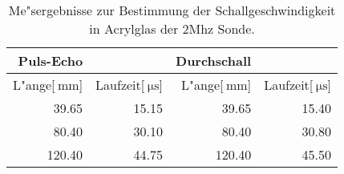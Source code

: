 
\begin{table}[!h]
\begin{center}
\begin{tabular}{|r|r|r|r|}
\hline
Puls-Echo & & Durchschall &\\
\hline
 L"ange[$\SI{}{\milli\meter}$] & Laufzeit[$\SI{}{\micro\second}$] & L"ange[$\SI{}{\milli\meter}$] & Laufzeit[$\SI{}{\micro\second}$]\\
\hline
\hline
 39.65 &	15.15 &	 39.65 &	15.40\\
 80.40 &	30.10 &	 80.40 &	30.80\\
120.40 &	44.75 &	120.40 &	45.50\\
\hline
\end{tabular}
\caption[]{Me"sergebnisse zur Bestimmung der Schallgeschwindigkeit in Acrylglas der 2Mhz Sonde.}
\label{a2}
\end{center}
\end{table}